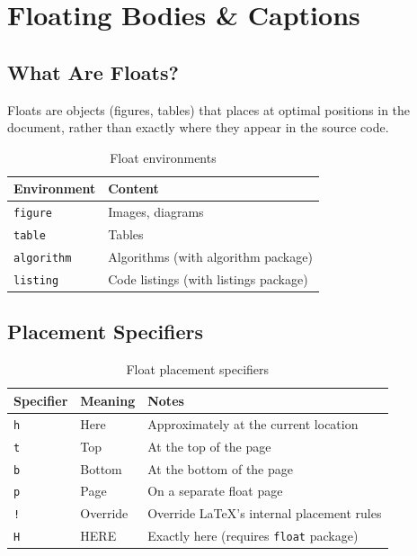 
\chapter{Floating Bodies \& Captions}

\section{What Are Floats?}

Floats are objects (figures, tables) that \latex{} places at optimal positions in the document, rather than exactly where they appear in the source code.

\begin{table}[H]
\centering
\begin{tabular}{ll}
\toprule
\textbf{Environment} & \textbf{Content} \\
\midrule
\texttt{figure}   & Images, diagrams \\
\texttt{table}    & Tables \\
\texttt{algorithm} & Algorithms (with algorithm package) \\
\texttt{listing}  & Code listings (with listings package) \\
\bottomrule
\end{tabular}
\caption{Float environments}
\end{table}

\section{Placement Specifiers}

\begin{table}[H]
\centering
\begin{tabular}{llp{8cm}}
\toprule
\textbf{Specifier} & \textbf{Meaning} & \textbf{Notes} \\
\midrule
\texttt{h} & Here       & Approximately at the current location \\
\texttt{t} & Top        & At the top of the page \\
\texttt{b} & Bottom     & At the bottom of the page \\
\texttt{p} & Page       & On a separate float page \\
\texttt{!} & Override   & Override LaTeX's internal placement rules \\
\texttt{H} & HERE       & Exactly here (requires \texttt{float} package) \\
\bottomrule
\end{tabular}
\caption{Float placement specifiers}
\end{table}

